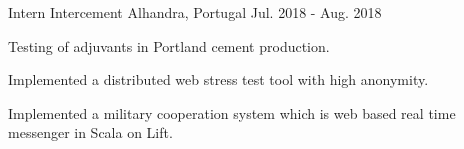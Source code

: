 \begin{cventries}
  \cventry
    {Intern} %
    {Intercement} %
    {Alhandra, Portugal} %
    {Jul. 2018 - Aug. 2018} %
    {
      \begin{cvitems} %
        \item {Testing of adjuvants in Portland cement production.}
        \item {Implemented a distributed web stress test tool with high anonymity.}
        \item {Implemented a military cooperation system which is web based real time messenger in Scala on Lift.}
      \end{cvitems}
    }

\end{cventries}

